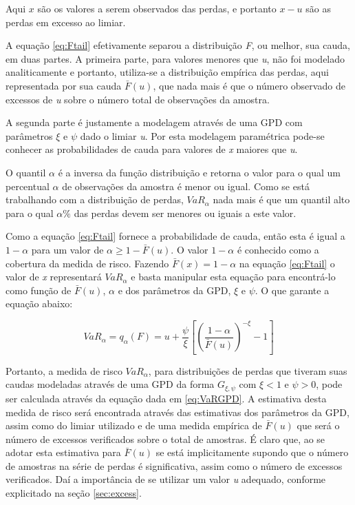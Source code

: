 \documentclass[1p]{elsarticle}
\theoremstyle{definition}
\begin{document}
Aqui $x$ são os valores a serem observados das perdas, e portanto $x-u$ são as perdas em excesso ao limiar.

A equação \eqref{eq:Ftail} efetivamente separou a distribuição \emph{F}, ou melhor, sua cauda, em duas partes. A primeira parte, para valores menores que \emph{u}, não foi modelado analiticamente e portanto, utiliza-se a distribuição empírica das perdas, aqui representada por sua cauda $\bar{F}(u)$, que nada mais é que o número observado de excessos de \emph{u} sobre o número total de observações da amostra.

A segunda parte é justamente a modelagem através de uma GPD com parâmetros $\xi$ e $\psi$ dado o limiar \emph{u}. Por esta modelagem paramétrica pode-se conhecer as probabilidades de cauda para valores de \emph{x} maiores que \emph{u}.

O quantil $\alpha$ é a inversa da função distribuição e retorna o valor para o qual um percentual $\alpha$ de observações da amostra é menor ou igual. Como se está trabalhando com a distribuição de perdas, $VaR_\alpha$ nada mais é que um quantil alto para o qual $\alpha \%$ das perdas devem ser menores ou iguais a este valor.

Como a equação \eqref{eq:Ftail} fornece a probabilidade de cauda, então esta é igual a $1- \alpha$ para um valor de $\alpha  \geq 1-\bar{F}(u)$. O valor $1- \alpha$ é conhecido como a cobertura da medida de risco. Fazendo $\bar{F}(x)=1-\alpha$ na equação \eqref{eq:Ftail} o valor de \emph{x} representará $VaR_\alpha$ e basta manipular esta equação para encontrá-lo como função de $\bar{F}(u)$, $\alpha$ e dos parâmetros da GPD, $\xi$ e $\psi$. O que garante a equação abaixo:

\begin{equation}
\label{eq:VaRGPD}
VaR_\alpha = q_\alpha(F) = u+\frac{\psi}{\xi}\left[ \left( \frac{1-\alpha}{\bar{F}(u)}\right)^{-\xi}-1 \right]
\end{equation}

Portanto, a medida de risco $VaR_\alpha$, para distribuições de perdas que tiveram suas caudas modeladas através de uma GPD da forma $G_{\xi, \psi}$ com $\xi <1 \text{ e } \psi > 0$, pode ser calculada através da equação dada em \eqref{eq:VaRGPD}. A estimativa desta medida de risco será encontrada através das estimativas dos parâmetros da GPD, assim como do limiar utilizado e de uma medida empírica de $\bar{F}(u)$ que será o número de excessos verificados sobre o total de amostras. É claro que, ao se adotar esta estimativa para $\bar{F}(u)$ se está implicitamente supondo que o número de amostras na série de perdas é significativa, assim como o número de excessos verificados. Daí a importância de se utilizar um valor \emph{u} adequado, conforme explicitado na seção \ref{sec:excess}.
\end{document}
